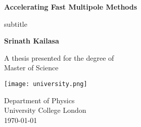 \begin{titlepage}
    \begin{center}
        \vspace*{1cm}
        
        \Huge
        \textbf{Accelerating Fast Multipole Methods}
        
        \Large
        \vspace{0.5cm}
        subtitle
             
        \vfill
 
        \textbf{Srinath Kailasa}
 
        \vspace{5cm}
             
        A thesis presented for the degree of\\
        Master of Science
             
        \vspace{0.8cm}
      
        \texttt{[image: university.png]}
        
        \large
        Department of Physics\\
        University College London\\
        \today
             
    \end{center}
 \end{titlepage}